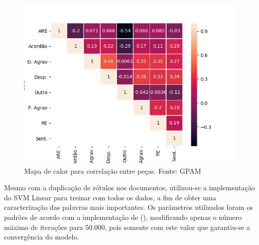 \begin{figure}[h]
  \includegraphics[keepaspectratio=true,scale=0.5]{figuras/correlacaoPecas}
  \centering
  \caption[Mapa de calor para correlação entre peças]{Mapa de calor para correlação entre peças. Fonte: GPAM \protect\footnotemark}
  \label{fig:correlacaoPecas}
\end{figure}

Mesmo com a duplicação de rótulos nos documentos, utilizou-se a implementação do SVM Linear \cite{HEARST1995} para treinar com todos os dados, a fim de obter uma caracterização das palavras mais importantes. Os parâmetros utilizados foram os padrões de acordo com a implementação de \citeauthor{PEDREGOSA2011} (\citeyear{PEDREGOSA2011}), modificando apenas o número máximo de iterações para 50.000, pois somente com este valor que garantiu-se a convergência do modelo.

